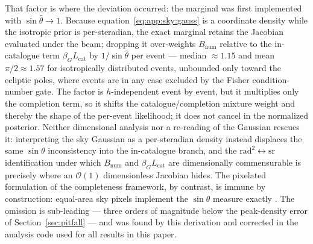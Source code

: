 That factor is where the deviation occurred: the marginal was first
implemented with $\sin\hat\theta \to 1$. Because
equation~\eqref{eq:app:sky:gauss} is a coordinate density while the isotropic
prior is per-steradian, the exact marginal retains the Jacobian evaluated
under the beam; dropping it over-weights $B_\mathrm{num}$ relative to the
in-catalogue term $\beta_G L_\mathrm{cat}$ by $1/\sin\hat\theta$ per event ---
median $\approx 1.15$ and mean $\pi/2 \approx 1.57$ for isotropically %
distributed events, unbounded only toward the ecliptic poles, where events are
in any case excluded by the Fisher condition-number gate. The factor is
$h$-independent event by event, but it multiplies only the completion term, so
it shifts the catalogue/completion mixture weight and thereby the shape of the
per-event likelihood; it does not cancel in the normalized posterior. Neither
dimensional analysis nor a re-reading of the Gaussian rescues it: interpreting
the sky Gaussian as a per-steradian density instead displaces the same
$\sin\theta$ inconsistency into the in-catalogue branch, and the
$\mathrm{rad}^2 \leftrightarrow \mathrm{sr}$ identification under which
$B_\mathrm{num}$ and $\beta_G L_\mathrm{cat}$ are dimensionally commensurable is
precisely where an $\mathcal{O}(1)$ dimensionless Jacobian hides. The
pixelated formulation of the completeness framework, by contrast, is immune by
construction: equal-area sky pixels implement the $\sin\theta$ measure exactly
\citep{Gray:2021sew}.
The omission is sub-leading --- three orders of magnitude below the
peak-density error of Section~\ref{sec:pitfall} --- and was found by this
derivation and corrected in the analysis code used for all results in this
paper. %

